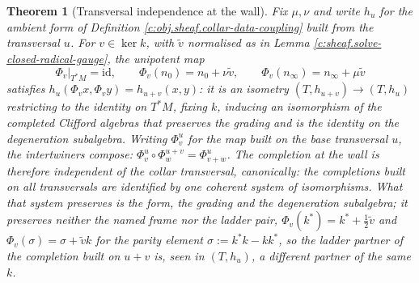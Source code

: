 \documentclass[11pt]{article}
\newtheorem{theorem}{Theorem}[section]
\theoremstyle{definition}
\theoremstyle{plain}
\newcommand{\changedmark}[2]{\marginpar{\raggedright\scriptsize\color{#1}#2}}
\providecommand{\id}{}\renewcommand{\id}{\mathrm{id}}
\providecommand{\nInf}{}\renewcommand{\nInf}{n_\infty}
\providecommand{\nO}{}\renewcommand{\nO}{n_0}
\begin{document}
\begin{theorem}[Transversal independence at the wall]\label{c:sheaf.transversal-independence-wall}
\changedmark{gray}{reworded}
Fix $\mu, \nu$ and write $h_u$ for the ambient form of Definition \ref{c:obj.sheaf.collar-data-coupling} built from the transversal $u$. For $v \in \ker k$, with $\tilde v$ normalised as in Lemma \ref{c:sheaf.solve-closed-radical-gauge}, the unipotent map
\[
\Phi_v\big|_{T^*M} = \id, \qquad \Phi_v(\nO) = \nO + \nu\tilde v, \qquad \Phi_v(\nInf) = \nInf + \mu\tilde v
\]
satisfies $h_u(\Phi_v x, \Phi_v y) = h_{u+v}(x, y)$: it is an isometry $(T, h_{u+v}) \to (T, h_u)$ restricting to the identity on $T^*M$, fixing $k$, inducing an isomorphism of the completed Clifford algebras that preserves the grading and is the identity on the degeneration subalgebra. Writing $\Phi^u_v$ for the map built on the base transversal $u$, the intertwiners compose: $\Phi^u_v \circ \Phi^{u+v}_w = \Phi^u_{v+w}$. The completion at the wall is therefore independent of the collar transversal, canonically: the completions built on all transversals are identified by one coherent system of isomorphisms. What that system preserves is the form, the grading and the degeneration subalgebra; it preserves neither the named frame nor the ladder pair, $\Phi_v(k^*) = k^* + \tfrac12\tilde v$ and $\Phi_v(\sigma) = \sigma + \tilde v k$ for the parity element $\sigma := k^*k - kk^*$, so the ladder partner of the completion built on $u + v$ is, seen in $(T, h_u)$, a different partner of the same $k$.
\end{theorem}
\end{document}
